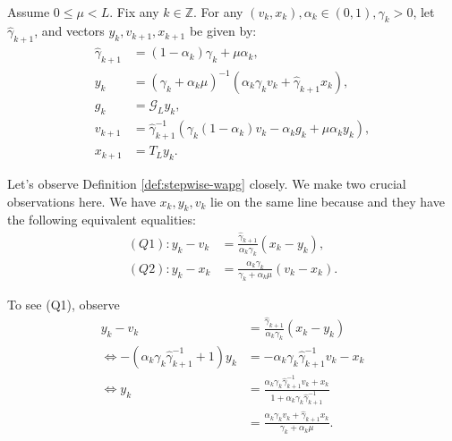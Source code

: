 \documentclass[12pt]{article}
\begin{document}
    \begin{definition}\label{def:stepwise-wapg}\;\\
        Assume $0 \le \mu < L$.
        Fix any $k \in \mathbb Z$. 
        For any $(v_k, x_k), \alpha_k \in (0, 1), \gamma_k > 0$, let $\hat \gamma_{k + 1}$, and vectors $y_k, v_{k + 1}, x_{k + 1}$ be given by: 
        \begin{align*}
            \hat \gamma_{k + 1} &= (1 - \alpha_k)\gamma_k + \mu \alpha_k, 
            \\
            y_k &= 
            (\gamma_k + \alpha_k \mu)^{-1}(\alpha_k \gamma_k v_k + \hat\gamma_{k + 1} x_k), 
            \\
            g_k &= \mathcal G_L y_k, 
            \\
            v_{k + 1} &= \hat\gamma^{-1}_{k + 1}
            (\gamma_k(1 - \alpha_k) v_k - \alpha_k g_k + \mu \alpha_k y_k), 
            \\
            x_{k + 1} &= T_L y_k. 
        \end{align*}
    \end{definition}
    \begin{observation}\label{obs:stepwise-wapg}
        Let's observe Definition \ref{def:stepwise-wapg} closely. 
        We make two crucial observations here. 
        We have $x_k, y_k, v_k$ lie on the same line because and they have the following equivalent equalities: 
        \begin{align*}
            (Q1): 
            y_k - v_k &= 
            \frac{\hat \gamma_{k + 1}}{\alpha_k \gamma_k}(x_k - y_k),
            \\
            (Q2): 
            y_k - x_k &= 
            \frac{\alpha_k \gamma_k}{\gamma_k + \alpha_k \mu}(v_k - x_k). 
        \end{align*}
    \end{observation}
        To see (Q1), observe 
        \begin{align*}
            y_k - v_k &= 
            \frac{\hat \gamma_{k + 1}}{\alpha_k \gamma_k}(x_k - y_k)
            \\
            \iff 
            -(\alpha_k \gamma_k \hat \gamma^{-1}_{k + 1} + 1)y_k
            &= 
            - \alpha_k \gamma_k \hat \gamma^{-1}_{k + 1}v_k - x_k
            \\
            \iff 
            y_k &= 
            \frac{
                \alpha_k \gamma_k \hat \gamma_{k + 1}^{-1}v_k + x_k
            }{1 + \alpha_k \gamma_k \hat \gamma_{k + 1}^{-1}}
            \\
            &=  
            \frac{\alpha_k \gamma_k v_k + \hat \gamma_{k + 1} x_k}{\gamma_k + \alpha_k \mu}.
        \end{align*}
\end{document}
